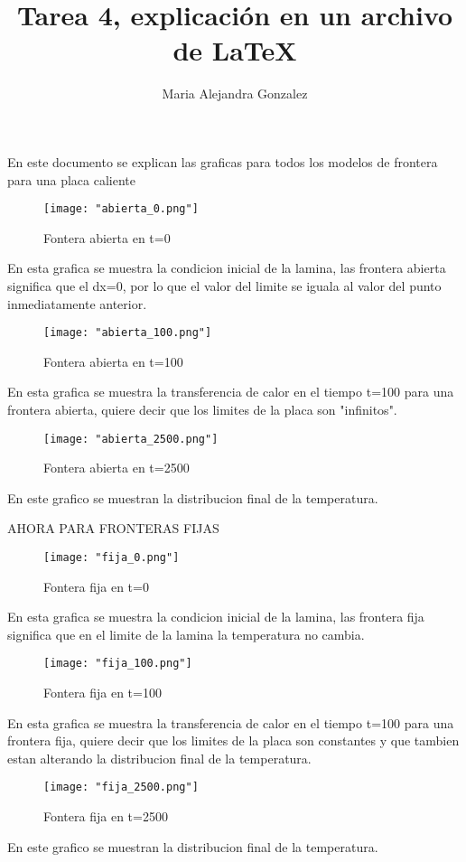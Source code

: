 \documentclass{article}
\title{Tarea 4, explicación en un archivo de \LaTeX}
\author{Maria Alejandra Gonzalez}
\begin{document}
En este documento se explican las graficas para todos los modelos de frontera para una placa caliente
\begin{figure}
  \centering
    \texttt{[image: "abierta\_0.png"]}
  \caption{Fontera abierta en t=0}
  \label{abierta en t=0}
\end{figure}
En esta grafica se muestra la condicion inicial de la lamina, las frontera abierta significa que el dx=0, por lo que el valor del limite se iguala al valor del punto inmediatamente anterior.
\begin{figure}
  \centering
    \texttt{[image: "abierta\_100.png"]}
  \caption{Fontera abierta en t=100}
  \label{abierta en t=100}
\end{figure}
En esta grafica se muestra la transferencia de calor en el tiempo t=100 para una frontera abierta, quiere decir que los limites de la placa son "infinitos".
\begin{figure}
  \centering
    \texttt{[image: "abierta\_2500.png"]}
  \caption{Fontera abierta en t=2500}
  \label{abierta en t=2500}
\end{figure}
En este grafico se muestran la distribucion final de la temperatura.


AHORA PARA FRONTERAS FIJAS
\begin{figure}
  \centering
    \texttt{[image: "fija\_0.png"]}
  \caption{Fontera fija en t=0}
  \label{fija en t=0}
\end{figure}
En esta grafica se muestra la condicion inicial de la lamina, las frontera fija significa que en el limite de la lamina la temperatura no cambia.
\begin{figure}
  \centering
    \texttt{[image: "fija\_100.png"]}
  \caption{Fontera fija en t=100}
  \label{fija en t=100}
\end{figure}
En esta grafica se muestra la transferencia de calor en el tiempo t=100 para una frontera fija, quiere decir que los limites de la placa son constantes y que tambien estan alterando la distribucion final de la temperatura.
\begin{figure}
  \centering
    \texttt{[image: "fija\_2500.png"]}
  \caption{Fontera fija en t=2500}
  \label{fija en t=2500}
\end{figure}
En este grafico se muestran la distribucion final de la temperatura.
\end{document}
